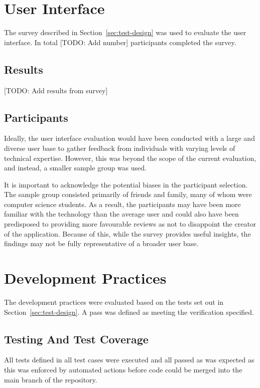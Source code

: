 \section{User Interface}
The survey described in Section~\ref{sec:test-design} was used to evaluate the user interface. In total [TODO: Add number] participants completed the survey.

\subsection{Results}
[TODO: Add results from survey]

\subsection{Participants}
Ideally, the user interface evaluation would have been conducted with a large and diverse user base to gather feedback from individuals with varying levels of technical expertise. However, this was beyond the scope of the current evaluation, and instead, a smaller sample group was used.

It is important to acknowledge the potential biases in the participant selection. The sample group consisted primarily of friends and family, many of whom were computer science students. As a result, the participants may have been more familiar with the technology than the average user and could also have been predisposed to providing more favourable reviews as not to disappoint the creator of the application. Because of this, while the survey provides useful insights, the findings may not be fully representative of a broader user base.

\section{Development Practices}
The development practices were evaluated based on the tests set out in Section~\ref{sec:test-design}. A pass was defined as meeting the verification specified.

\subsection{Testing And Test Coverage}
All tests defined in all test cases were executed and all passed as was expected as this was enforced by automated actions before code could be merged into the main branch of the repository.

